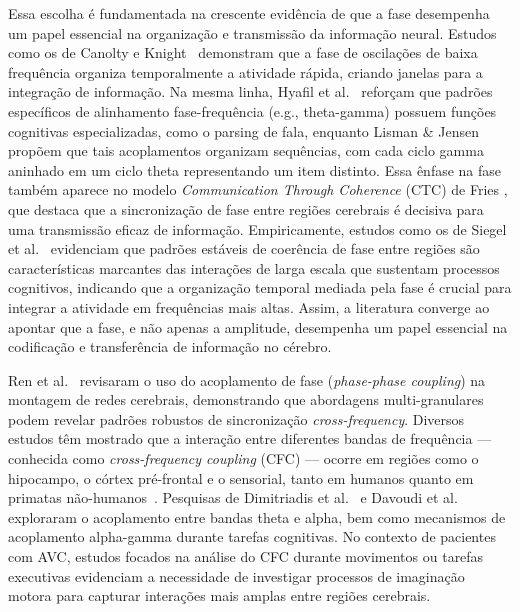 Essa escolha é fundamentada na crescente evidência de que a fase desempenha um papel essencial na organização e transmissão da informação neural. Estudos como os de Canolty e Knight~\cite{canolty2010functional} demonstram que a fase de oscilações de baixa frequência organiza temporalmente a atividade rápida, criando janelas para a integração de informação. Na mesma linha, Hyafil et al.~\cite{hyafil2015neural} reforçam que padrões específicos de alinhamento fase-frequência (e.g., theta-gamma) possuem funções cognitivas especializadas, como o parsing de fala, enquanto Lisman \& Jensen~\cite{lisman2013theta} propõem que tais acoplamentos organizam sequências, com cada ciclo gamma aninhado em um ciclo theta representando um item distinto. Essa ênfase na fase também aparece no modelo \emph{Communication Through Coherence} (CTC) de Fries \cite{fries2015rhythms}, que destaca que a sincronização de fase entre regiões cerebrais é decisiva para uma transmissão eficaz de informação. Empiricamente, estudos como os de Siegel et al.~\cite{siegel2012spectral} evidenciam que padrões estáveis de coerência de fase entre regiões são características marcantes das interações de larga escala que sustentam processos cognitivos, indicando que a organização temporal mediada pela fase é crucial para integrar a atividade em frequências mais altas. Assim, a literatura converge ao apontar que a fase, e não apenas a amplitude, desempenha um papel essencial na codificação e transferência de informação no cérebro.

Ren et al.~\cite{ren2022multi} revisaram o uso do acoplamento de fase (\textit{phase-phase coupling}) na montagem de redes cerebrais, demonstrando que abordagens multi-granulares podem revelar padrões robustos de sincronização \textit{cross-frequency}. Diversos estudos têm mostrado que a interação entre diferentes bandas de frequência --- conhecida como \textit{cross-frequency coupling} (CFC) --- ocorre em regiões como o hipocampo, o córtex pré-frontal e o sensorial, tanto em humanos quanto em primatas não-humanos~\cite{mormann2005phase, canolty2006high, jensen2007cross, khamechian2020decoding}. Pesquisas de Dimitriadis et al.~\cite{dimitriadis2015cognitive} e Davoudi et al.~\cite{davoudi2021prefrontal} exploraram o acoplamento entre bandas theta e alpha, bem como mecanismos de acoplamento alpha-gamma durante tarefas cognitivas. No contexto de pacientes com AVC, estudos focados na análise do CFC durante movimentos ou tarefas executivas evidenciam a necessidade de investigar processos de imaginação motora para capturar interações mais amplas entre regiões cerebrais.

